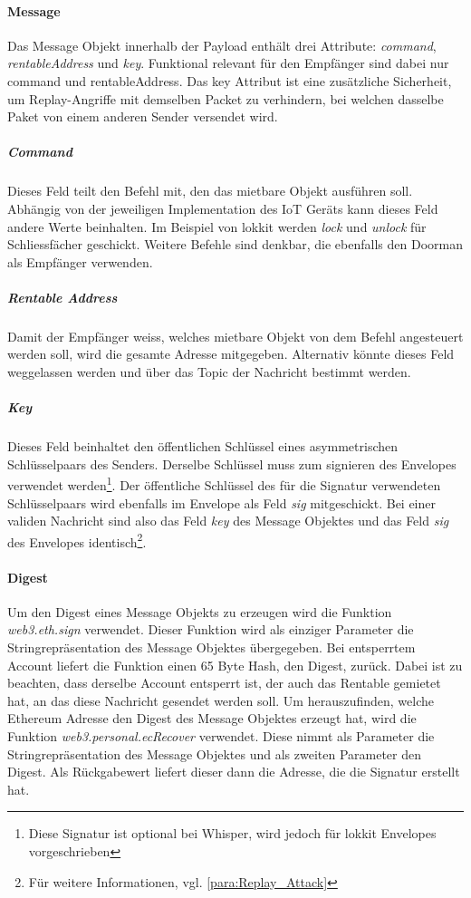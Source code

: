 \paragraph{Message}
\label{sys_para:Message}
Das Message Objekt innerhalb der Payload enthält drei Attribute: \emph{command}, \emph{rentableAddress} und \emph{key}. Funktional relevant für den Empfänger sind dabei nur command und rentableAddress. Das key Attribut ist eine zusätzliche Sicherheit, um Replay-Angriffe mit demselben Packet zu verhindern, bei welchen dasselbe Paket von einem anderen Sender versendet wird.
\subparagraph{Command}
\label{sys_subpara:Command}
Dieses Feld teilt den Befehl mit, den das mietbare Objekt ausführen soll. Abhängig von der jeweiligen Implementation des IoT Geräts kann dieses Feld andere Werte beinhalten. Im Beispiel von lokkit werden \emph{lock} und \emph{unlock} für Schliessfächer geschickt. Weitere Befehle sind denkbar, die ebenfalls den Doorman als Empfänger verwenden.
\subparagraph{Rentable Address}
Damit der Empfänger weiss, welches mietbare Objekt von dem Befehl angesteuert werden soll, wird die gesamte Adresse mitgegeben. Alternativ könnte dieses Feld weggelassen werden und über das Topic der Nachricht bestimmt werden.

\subparagraph{Key}
\label{sys_para:Key}
Dieses Feld beinhaltet den öffentlichen Schlüssel eines asymmetrischen Schlüsselpaars des Senders. Derselbe Schlüssel muss zum signieren des Envelopes verwendet werden\footnote{Diese Signatur ist optional bei Whisper, wird jedoch für lokkit Envelopes vorgeschrieben}. Der öffentliche Schlüssel des für die Signatur verwendeten Schlüsselpaars wird ebenfalls im Envelope als Feld \emph{sig} mitgeschickt. Bei einer validen Nachricht sind also das Feld \emph{key} des Message Objektes und das Feld \emph{sig} des Envelopes identisch\footnote{Für weitere Informationen, vgl. \ref{para:Replay_Attack}}.

\paragraph{Digest}
\label{sys_para:Digest}
Um den Digest eines Message Objekts zu erzeugen wird die Funktion \emph{web3.eth.sign} verwendet. Dieser Funktion wird als einziger Parameter die Stringrepräsentation des Message Objektes übergegeben. Bei entsperrtem Account liefert die Funktion einen 65 Byte Hash, den Digest, zurück. Dabei ist zu beachten, dass derselbe Account entsperrt ist, der auch das Rentable gemietet hat, an das diese Nachricht gesendet werden soll. Um herauszufinden, welche Ethereum Adresse den Digest des Message Objektes erzeugt hat, wird die Funktion \emph{web3.personal.ecRecover} verwendet. Diese nimmt als Parameter die Stringrepräsentation des Message Objektes und als zweiten Parameter den Digest. Als Rückgabewert liefert dieser dann die Adresse, die die Signatur erstellt hat.

